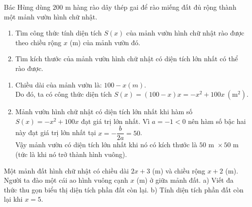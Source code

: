 \begin{bt}%
	Bác Hùng dùng $200$ m hàng rào dây thép gai để rào miếng đất đủ rộng thành một mảnh vườn hình chữ nhật.
	\begin{enumerate}
		\item Tìm công thức tính diện tích $S(x)$ của mảnh vườn hình chữ nhật rào được theo chiều rộng $x$ (m) của mảnh vườn đó.
		\item Tìm kích thước của mảnh vườn hình chữ nhật có diện tích lớn nhất có thể rào được.
	\end{enumerate}
	\loigiai
	{
		\begin{enumerate}
			\item Chiều dài của mảnh vườn là: $100-x(m)$.\\
			Do đó, ta có công thức diện tích $S(x)=(100-x) x=-x^2+100 x~\left(\text{m}^2\right)$.
			\item Mảnh vườn hình chữ nhật có diện tích lớn nhất khi hàm số $S(x)=-x^2+100 x$ đạt giá trị lớn nhất. Vì $a=-1<0$ nên hàm số bậc hai này đạt giá trị lớn nhất tại $x=-\dfrac{b}{2 a}=50$.\\
			Vậy mảnh vườn có diện tích lớn nhất khi nó có kích thước là $50 \text{ m } \times 50 \text{ m}$ (tức là khi nó trở thành hình vuông).
		\end{enumerate}
	}
\end{bt}

\begin{bt}%
	Một mảnh đất hình chữ nhật có chiều dài $2x + 3$ (m) và chiều rộng $x + 2$ (m). Người ta đào một cái ao hình vuông cạnh $x$ (m) ở giữa mảnh đất.
a) Viết đa thức thu gọn biểu thị diện tích phần đất còn lại.
b) Tính diện tích phần đất còn lại khi $x = 5$.
\end{bt}

